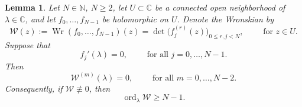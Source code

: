 \documentclass[11pt]{amsart}
\numberwithin{equation}{section}
\newtheorem{lemma}[theorem]{Lemma}
\theoremstyle{definition}
\theoremstyle{remark}
\newcommand{\C}{\mathbb C}
\newcommand{\N}{\mathbb N}
\newcommand{\cW}{\mathcal W}
\newcommand{\Wr}{\operatorname{Wr}}
\newcommand{\ord}{\operatorname{ord}}
\begin{document}
\begin{lemma}
    \label{lem:wronskian-amplification}
    Let $N \in \N$, $N \geq 2$, let $U\subset\C$ be a connected open neighborhood of $\lambda\in\C$,
    and let $f_0,\ldots,f_{N-1}$ be holomorphic on $U$. Denote the Wronskian by
    \begin{equation}\label{eq:Wr-amplification-W}
        \cW(z)
        := \Wr(f_0,\ldots,f_{N-1})(z)
        = \det\bigl(f_j^{(r)}(z)\bigr)_{0\leq r,j<N},
        \qquad \text{ for } z\in U.
    \end{equation}
    Suppose that
    \begin{equation}\label{eq:Wr-amplification-hypothesis}
        f_j'(\lambda)=0,
        \qquad \text{ for all } j=0,\ldots,N-1.
    \end{equation}
    Then
    \begin{equation}\label{eq:Wr-derivative-vanishing}
        \cW^{(m)}(\lambda)=0,
        \qquad \text{ for all } m=0,\ldots,N-2.
    \end{equation}
    Consequently, if $\cW\not\equiv 0$, then
    \begin{equation}\label{eq:Wr-order}
        \ord_{\lambda}\cW\geq N-1.
    \end{equation}
\end{lemma}
\end{document}
